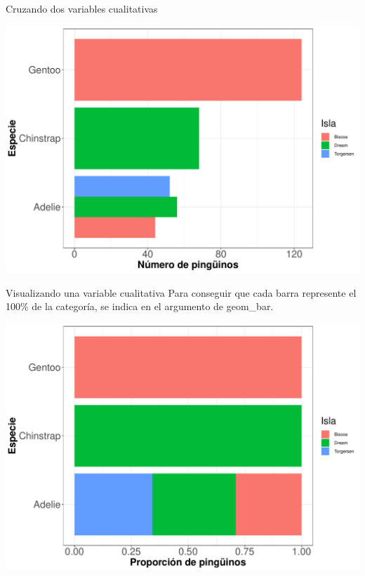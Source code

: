 \documentclass[
  ignorenonframetext,
  aspectratio=169]{beamer}
\begin{document}
\begin{frame}{Cruzando dos variables cualitativas}
\protect\hypertarget{cruzando-dos-variables-cualitativas-1}{}
\begin{center}\includegraphics[width=0.6\linewidth,height=0.6\textheight]{tidyverse_AD_files/figure-beamer/unnamed-chunk-130-1} \end{center}
\end{frame}

\begin{frame}{Visualizando una variable cualitativa}
\protect\hypertarget{visualizando-una-variable-cualitativa-1}{}
Para conseguir que cada barra represente el 100\% de la categoría, se
indica en el argumento de geom\_bar.

\begin{center}\includegraphics[width=0.6\linewidth,height=0.6\textheight]{tidyverse_AD_files/figure-beamer/unnamed-chunk-131-1} \end{center}
\end{frame}
\end{document}
